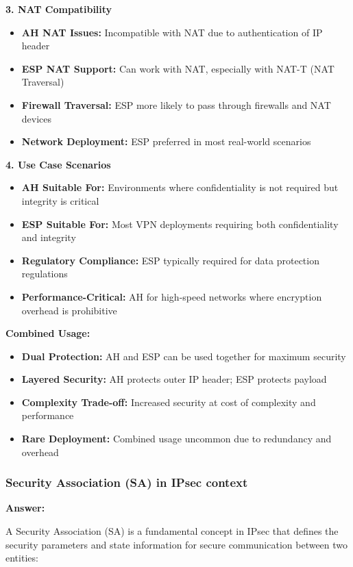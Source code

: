 \documentclass[12pt,a4paper]{article}
\begin{document}
\textbf{3. NAT Compatibility}
\begin{itemize}
    \item \textbf{AH NAT Issues:} Incompatible with NAT due to authentication of IP header
    \item \textbf{ESP NAT Support:} Can work with NAT, especially with NAT-T (NAT Traversal)
    \item \textbf{Firewall Traversal:} ESP more likely to pass through firewalls and NAT devices
    \item \textbf{Network Deployment:} ESP preferred in most real-world scenarios
\end{itemize}

\textbf{4. Use Case Scenarios}
\begin{itemize}
    \item \textbf{AH Suitable For:} Environments where confidentiality is not required but integrity is critical
    \item \textbf{ESP Suitable For:} Most VPN deployments requiring both confidentiality and integrity
    \item \textbf{Regulatory Compliance:} ESP typically required for data protection regulations
    \item \textbf{Performance-Critical:} AH for high-speed networks where encryption overhead is prohibitive
\end{itemize}

\textbf{Combined Usage:}
\begin{itemize}
    \item \textbf{Dual Protection:} AH and ESP can be used together for maximum security
    \item \textbf{Layered Security:} AH protects outer IP header; ESP protects payload
    \item \textbf{Complexity Trade-off:} Increased security at cost of complexity and performance
    \item \textbf{Rare Deployment:} Combined usage uncommon due to redundancy and overhead
\end{itemize}

\subsubsection{Security Association (SA) in IPsec context}

\textbf{Answer:}

A Security Association (SA) is a fundamental concept in IPsec that defines the security parameters and state information for secure communication between two entities:
\end{document}
